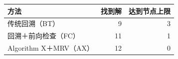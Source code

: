 \begin{tabular}{lrr}
\toprule
方法 & 找到解 & 达到节点上限 \\
\midrule
传统回溯（BT） & 9 & 3 \\
回溯＋前向检查（FC） & 11 & 1 \\
Algorithm X＋MRV（AX） & 12 & 0 \\
\bottomrule
\end{tabular}
